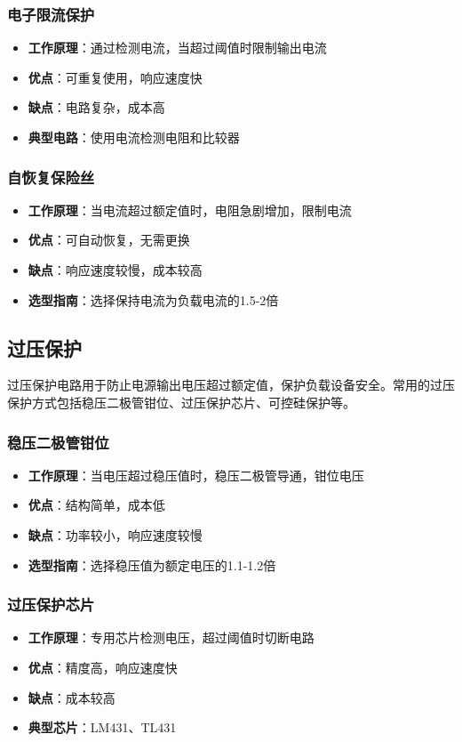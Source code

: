 \documentclass[12pt,UTF8]{ctexbook}
\begin{document}
\subsubsection{电子限流保护}
\begin{itemize}
    \item \textbf{工作原理}：通过检测电流，当超过阈值时限制输出电流
    \item \textbf{优点}：可重复使用，响应速度快
    \item \textbf{缺点}：电路复杂，成本高
    \item \textbf{典型电路}：使用电流检测电阻和比较器
\end{itemize}

\subsubsection{自恢复保险丝}
\begin{itemize}
    \item \textbf{工作原理}：当电流超过额定值时，电阻急剧增加，限制电流
    \item \textbf{优点}：可自动恢复，无需更换
    \item \textbf{缺点}：响应速度较慢，成本较高
    \item \textbf{选型指南}：选择保持电流为负载电流的1.5-2倍
\end{itemize}

\subsection{过压保护}

过压保护电路用于防止电源输出电压超过额定值，保护负载设备安全。常用的过压保护方式包括稳压二极管钳位、过压保护芯片、可控硅保护等。

\subsubsection{稳压二极管钳位}
\begin{itemize}
    \item \textbf{工作原理}：当电压超过稳压值时，稳压二极管导通，钳位电压
    \item \textbf{优点}：结构简单，成本低
    \item \textbf{缺点}：功率较小，响应速度较慢
    \item \textbf{选型指南}：选择稳压值为额定电压的1.1-1.2倍
\end{itemize}

\subsubsection{过压保护芯片}
\begin{itemize}
    \item \textbf{工作原理}：专用芯片检测电压，超过阈值时切断电路
    \item \textbf{优点}：精度高，响应速度快
    \item \textbf{缺点}：成本较高
    \item \textbf{典型芯片}：LM431、TL431
\end{itemize}
\end{document}
